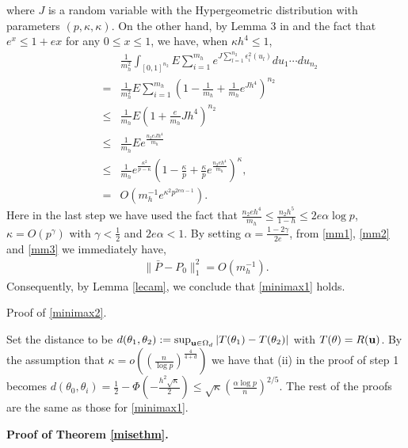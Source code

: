 \documentclass[11pt]{article}
\theoremstyle{definition}
\begin{document}
 where $J$ is a random variable with the Hypergeometric distribution with parameters $(p,\kappa,\kappa)$.  On the other hand, by Lemma 3 in
 \cite{Cai2017} and the fact that $e^x\leq 1+ex$ for any $0\leq x\leq 1$, we have, when $\kappa h^4\leq 1$,
 \begin{eqnarray}\label{mm3}
 	&&\frac{1}{m^2_h}\int_{[0,1]^{n_2}} E \sum_{i=1}^{m_h}e^{J\sum_{l=1}^{n_2}\epsilon_i^2(u_l)} du_1\cdots du_{n_2} \\
 	&=&\frac{1}{m^2_h}E\sum_{i=1}^{m_h} \left(  1-\frac{1}{m_h}+\frac{1}{m_h}e^{Jh^4}\right)^{n_2} \nonumber\\
 	&\leq&  \frac{1}{m_h}E\left(1+\frac{e}{m_h}Jh^4\right)^{n_2}   \nonumber\\
 	&\leq& \frac{1}{m_h}Ee^{\frac{n_2eJh^4}{m_h}}   \nonumber\\
 	&\leq& \frac{1}{m_h} e^{\frac{\kappa^2}{p-\kappa}} \left(1-\frac{\kappa}{p}+\frac{\kappa}{p}e^{\frac{n_2eh^4}{m_h}}\right)^\kappa, \nonumber \\
 	&=& O(m_h^{-1}e^{ {\kappa^2} p^{2e\alpha-1}}). \nonumber
 \end{eqnarray}
 Here in the last step we have used the fact that $\frac{n_2eh^4}{m_h}\leq \frac{n_2h^5}{1-h}\leq 2e\alpha\log p$, $\kappa=O(p^{\gamma})$ with $\gamma<\frac{1}{2}$ and $2e\alpha<1$.
 By setting $\alpha=\frac{1-2\gamma}{2e}$, from \eqref{mm1}, \eqref{mm2} and \eqref{mm3} we immediately have,
 \begin{eqnarray*}
 	\|\bar{P}-P_0\|_1^2=O(m_h^{-1}).
 \end{eqnarray*}
 Consequently, by Lemma \ref{lecam}, we conclude that \eqref{minimax1} holds.
 
 
 \noindent
 {\sc Proof of \eqref{minimax2}.}
 
 \noindent
 Set the distance to be $d(\theta_1,\theta_2):=\sup_{{\bf u}\in \Omega_d}|T(\theta_1)-T(\theta_2)|$ with $T(\theta)=R({\bf u})$. By the assumption that $\kappa=o\left(\left(\frac{n}{\log p}\right)^{\frac{4}{4+d}}\right)$ we have that (ii) in the proof of step 1 becomes $d(\theta_0,\theta_i)=\frac{1}{2}-\Phi\left(-\frac{h^2\sqrt{\kappa}}{2}\right)\leq \sqrt{\kappa} \left(  \frac{\alpha \log p }{n }\right)^{2/5}$. The rest of the proofs are the same as those for \eqref{minimax1}.
 
 
 
 \vspace{2mm}
 \noindent
 {\bf Proof of Theorem \ref{misethm}.}
 
\end{document}
